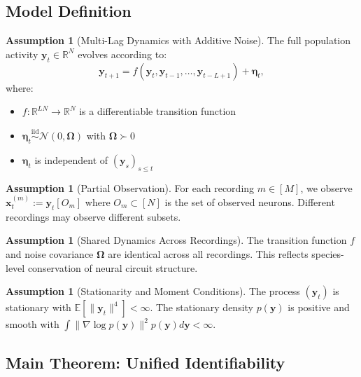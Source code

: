 \documentclass{article}
\theoremstyle{plain}
\theoremstyle{definition}
\newtheorem{assumption}[theorem]{Assumption}
\theoremstyle{remark}
\newcommand{\R}{\mathbb{R}}
\newcommand{\E}{\mathbb{E}}
\newcommand{\1}{\mathbf{1}}
\newcommand{\x}{\bm{x}}
\newcommand{\y}{\bm{y}}
\begin{document}
\subsection{Model Definition}

\begin{assumption}[Multi-Lag Dynamics with Additive Noise]
\label{ass:dynamics_new}
The full population activity $\y_t \in \R^N$ evolves according to:
\begin{equation}
\y_{t+1} = f(\y_t, \y_{t-1}, \ldots, \y_{t-L+1}) + \bm{\eta}_t,
\label{eq:dynamics_full}
\end{equation}
where:
\begin{itemize}[leftmargin=1.5em]
\item $f: \R^{LN} \to \R^N$ is a differentiable transition function
\item $\bm{\eta}_t \overset{\text{iid}}{\sim} \mathcal{N}(0, \bm{\Omega})$ with $\bm{\Omega} \succ 0$
\item $\bm{\eta}_t$ is independent of $(\y_s)_{s \leq t}$
\end{itemize}
\end{assumption}

\begin{assumption}[Partial Observation]
\label{ass:partial_new}
For each recording $m \in [M]$, we observe $\x^{(m)}_t := \y_t[O_m]$ where $O_m \subset [N]$ is the set of observed neurons. Different recordings may observe different subsets.
\end{assumption}

\begin{assumption}[Shared Dynamics Across Recordings]
\label{ass:shared_new}
The transition function $f$ and noise covariance $\bm{\Omega}$ are identical across all recordings. This reflects species-level conservation of neural circuit structure.
\end{assumption}

\begin{assumption}[Stationarity and Moment Conditions]
\label{ass:moments}
The process $(\y_t)$ is stationary with $\E[\|\y_t\|^4] < \infty$. The stationary density $p(\y)$ is positive and smooth with $\int \|\nabla \log p(\y)\|^2 p(\y) d\y < \infty$.
\end{assumption}

\subsection{Main Theorem: Unified Identifiability}
\end{document}
